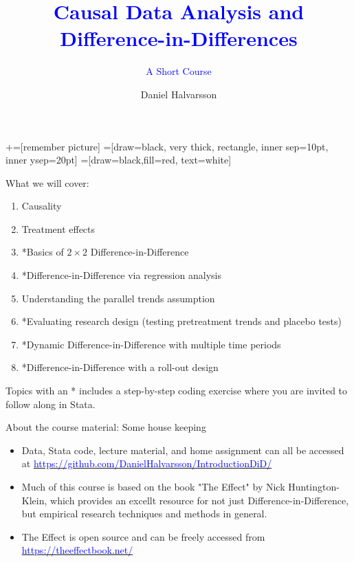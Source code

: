 \documentclass[notes,11pt, aspectratio=169]{beamer}
\title[]{\textcolor{blue}{Causal Data Analysis and Difference-in-Differences}}
\subtitle[]{\textcolor{blue}{A Short Course}}
\author[DH]{Daniel Halvarsson}
\institute{The Ratio Institute, Stockholm\\
\vspace{0.2cm}
 \href{daniel.halvarsson@ratio.se}{daniel.halvarsson@ratio.se}}
\date{}
\begin{document}
\newcommand\marktopleft[1]{%
    \tikz[overlay,remember picture] 
        \node (marker-#1-a) at (-.3em,.3em) {};%
}
\newcommand\markbottomright[2]{%
    \tikz[overlay,remember picture] 
        \node (marker-#1-b) at (0em,0em) {};%
}
+=[remember picture] 
 =[draw=black, very thick, rectangle, inner sep=10pt, inner ysep=20pt]
 =[draw=black,fill=red, text=white]

\begin{frame}
\maketitle
\end{frame}

\begin{frame}{What we will cover:}
\begin{enumerate}
\item Causality
\item Treatment effects 
\item *Basics of $2\times 2$ Difference-in-Difference
\item *Difference-in-Difference via regression analysis
\item Understanding the parallel trends assumption
\item *Evaluating research design (testing pretreatment trends and placebo tests)
\item *Dynamic Difference-in-Difference with multiple time periods
\item *Difference-in-Difference with a roll-out design 
\end{enumerate}
\vspace{0.5cm}
Topics with an * includes a step-by-step coding exercise where you are invited to follow along in Stata. 
\end{frame} 

\begin{frame}{About the course material: Some house keeping}
\begin{itemize}
    \item Data, Stata code, lecture material, and home assignment can all be accessed at 
    \href{https://github.com/DanielHalvarsson/IntroductionDiD/}{\textcolor{blue}{https://github.com/DanielHalvarsson/IntroductionDiD/}}

    \item Much of this course is based on the book "The Effect" by Nick Huntington-Klein, which provides an excellt resource for not just Difference-in-Difference, but empirical research techniques and methods in general.

    \item The Effect is open source and can be freely accessed from 
    \href{https://theeffectbook.net/}{\textcolor{blue}{https://theeffectbook.net/}}
\end{itemize}
\end{frame} 
\end{document}

